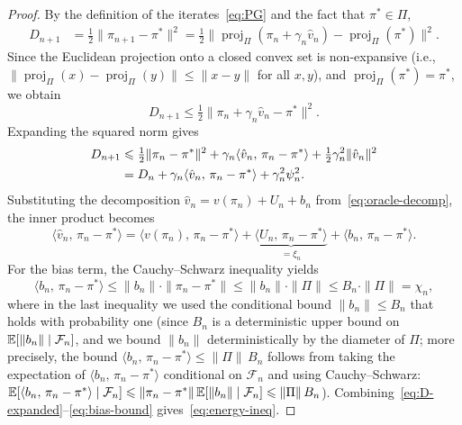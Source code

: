 \documentclass[a4paper,oneside,11pt]{report}
\newcommand{\calF}{\mathcal{F}}
\newcommand{\ip}[2]{\langle #1,\, #2 \rangle}
\newcommand{\norm}[1]{\| #1 \|}
\newcommand{\projPi}{\operatorname{proj}_\Pi}
\numberwithin{theorem}{chapter}
\numberwithin{equation}{chapter}
\begin{document}
\begin{proof}
  By the definition of the iterates~\eqref{eq:PG} and the fact that
  $\pi^* \in \Pi$,
  \begin{align}
    D_{n+1}
    &= \tfrac{1}{2}\norm{\pi_{n+1} - \pi^*}^2
    = \tfrac{1}{2}\norm{\projPi(\pi_n + \gamma_n \hat v_n)
      - \projPi(\pi^*)}^2.
      \label{eq:D-expand-1}
  \end{align}
  Since the Euclidean projection onto a closed convex set is
  non-expansive (i.e., $\norm{\projPi(x) - \projPi(y)} \le \norm{x-y}$
  for all $x, y$), and $\projPi(\pi^*) = \pi^*$, we obtain
  \begin{equation}
    D_{n+1} \le \tfrac{1}{2}\norm{\pi_n + \gamma_n \hat v_n - \pi^*}^2.
    \label{eq:nonexpansive}
  \end{equation}
  Expanding the squared norm gives
  \begin{align}
    D_{n+1}
    &\le \tfrac{1}{2}\norm{\pi_n - \pi^*}^2
       + \gamma_n \ip{\hat v_n}{\pi_n - \pi^*}
       + \tfrac{1}{2}\gamma_n^2 \norm{\hat v_n}^2 \notag\\
    &= D_n + \gamma_n \ip{\hat v_n}{\pi_n - \pi^*}
       + \gamma_n^2 \psi_n^2.
       \label{eq:D-expanded}
  \end{align}
  Substituting the decomposition
  $\hat v_n = v(\pi_n) + U_n + b_n$ from~\eqref{eq:oracle-decomp}, the
  inner product becomes
  \begin{equation}
    \ip{\hat v_n}{\pi_n - \pi^*}
    = \ip{v(\pi_n)}{\pi_n - \pi^*}
    + \underbrace{\ip{U_n}{\pi_n - \pi^*}}_{= \xi_n}
    + \ip{b_n}{\pi_n - \pi^*}.
    \label{eq:ip-decomp}
  \end{equation}
  For the bias term, the Cauchy--Schwarz inequality yields
  \begin{equation}
    \ip{b_n}{\pi_n - \pi^*}
    \le \norm{b_n} \cdot \norm{\pi_n - \pi^*}
    \le \norm{b_n} \cdot \norm{\Pi}
    \le B_n \cdot \norm{\Pi} = \chi_n,
    \label{eq:bias-bound}
  \end{equation}
  where in the last inequality we used the conditional bound
  $\norm{b_n} \le B_n$ that holds with probability one (since
  $B_n$ is a deterministic upper bound on
  $\E[\norm{b_n} \mid \calF_n]$, and we bound $\norm{b_n}$
  deterministically by the diameter of $\Pi$; more precisely, the bound
  $\ip{b_n}{\pi_n-\pi^*} \le \norm{\Pi}\, B_n$ follows from taking the
  expectation of $\ip{b_n}{\pi_n - \pi^*}$ conditional on $\calF_n$
  and using Cauchy--Schwarz:
  $\E[\ip{b_n}{\pi_n-\pi^*} \mid \calF_n]
  \le \norm{\pi_n-\pi^*}\, \E[\norm{b_n}\mid\calF_n]
  \le \norm{\Pi}\, B_n$). Combining~\eqref{eq:D-expanded}--\eqref{eq:bias-bound}
  gives~\eqref{eq:energy-ineq}.
\end{proof}
\end{document}
